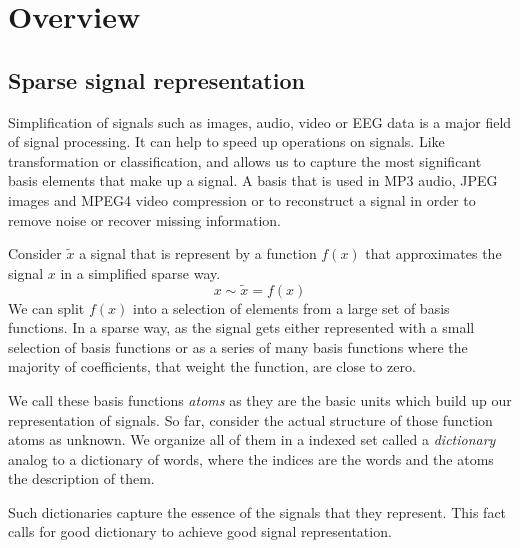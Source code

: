 \chapter{Overview}

\section{Sparse signal representation}
\label{sec:dicts}
Simplification of signals such as images, audio, video or EEG data is a major
field of signal processing. It can help to speed up operations on signals. Like
transformation or classification, and allows us to capture the most
significant basis elements that make up a signal. A basis that is
used in MP3 audio, JPEG images and MPEG4 video compression or to reconstruct
a signal in order to remove noise or recover missing information.

Consider $\tilde{x}$ a signal that is represent by a function $f(x)$ that
approximates the signal $x$ in a simplified sparse way.
\begin{equation*}
x \sim \tilde{x} = f\left(x\right)
\end{equation*}
We can split $f(x)$ into a selection of elements from a large set of
basis functions. In a sparse way, as the signal gets either represented with
a small selection of basis functions or as a series of many basis
functions where the majority of coefficients, that weight the function, are
close to zero. 

We call these basis functions \emph{atoms} as they are the basic units
which build up our representation of signals. So far, consider the actual
structure of those function atoms as unknown. We organize all of them in a
indexed set called a \emph{dictionary} analog to a dictionary of words, where
the indices are the words and the atoms the description of them. 

Such dictionaries capture the essence of the signals that they represent.
This fact calls for good dictionary to achieve good signal representation.

